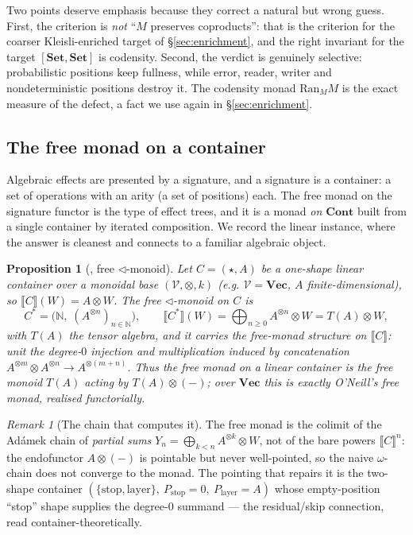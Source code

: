 \documentclass[11pt]{amsart}
\theoremstyle{plain}
\newtheorem{proposition}[theorem]{Proposition}
\theoremstyle{definition}
\theoremstyle{remark}
\newtheorem{remark}[theorem]{Remark}
\newcommand{\Set}{\mathbf{Set}}
\newcommand{\Cont}{\mathbf{Cont}}
\newcommand{\Vect}{\mathbf{Vec}}
\newcommand{\Ran}{\mathrm{Ran}}
\newcommand{\ext}[1]{\llbracket #1 \rrbracket}
\newcommand{\tri}{\triangleleft}
\begin{document}
Two points deserve emphasis because they correct a natural but wrong guess. First, the criterion is
\emph{not} ``$M$ preserves coproducts'': that is the criterion for the coarser Kleisli-enriched target
of \S\ref{sec:enrichment}, and the right invariant for the target $[\Set,\Set]$ is codensity. Second,
the verdict is genuinely selective: probabilistic positions keep fullness, while error, reader, writer
and nondeterministic positions destroy it. The codensity monad $\Ran_M M$ is the exact measure of the
defect, a fact we use again in \S\ref{sec:enrichment}.

\subsection{The free monad on a container}\label{ssec:free}
Algebraic effects are presented by a signature, and a signature is a container: a set of operations
with an arity (a set of positions) each. The free monad on the signature functor is the type of
effect trees, and it is a monad \emph{on $\Cont$} built from a single container by iterated
composition. We record the linear instance, where the answer is cleanest and connects to a familiar
algebraic object.

\begin{proposition}[\cite{MacBethBase}, free $\tri$-monoid]\label{prop:free}
Let $C=(\star,A)$ be a one-shape linear container over a monoidal base $(\mathcal V,\otimes,k)$ (e.g.
$\mathcal V=\Vect$, $A$ finite-dimensional), so $\ext{C}(W)=A\otimes W$. The free $\tri$-monoid on $C$
is
\[
  C^{*}=\big(\mathbb N,\;(A^{\otimes n})_{n\in\mathbb N}\big),\qquad
  \ext{C^{*}}(W)=\bigoplus_{n\ge0}A^{\otimes n}\otimes W=T(A)\otimes W,
\]
with $T(A)$ the tensor algebra, and it carries the free-monad structure on $\ext{C}$: unit the
degree-$0$ injection and multiplication induced by concatenation $A^{\otimes m}\otimes A^{\otimes
n}\to A^{\otimes(m+n)}$. Thus the free monad on a linear container is the free monoid $T(A)$ acting by
$T(A)\otimes(-)$; over $\Vect$ this is exactly O'Neill's free monad, realised functorially.
\end{proposition}

\begin{remark}[The chain that computes it]
The free monad is the colimit of the Adámek chain of \emph{partial sums} $Y_n=\bigoplus_{k<n}
A^{\otimes k}\otimes W$, not of the bare powers $\ext{C}^{n}$: the endofunctor $A\otimes(-)$ is
pointable but never well-pointed, so the naive $\omega$-chain does not converge to the monad. The
pointing that repairs it is the two-shape container $(\{\mathrm{stop},\mathrm{layer}\},\
P_{\mathrm{stop}}=0,\ P_{\mathrm{layer}}=A)$ whose empty-position ``stop'' shape supplies the
degree-$0$ summand --- the residual/skip connection, read container-theoretically.
\end{remark}
\end{document}
